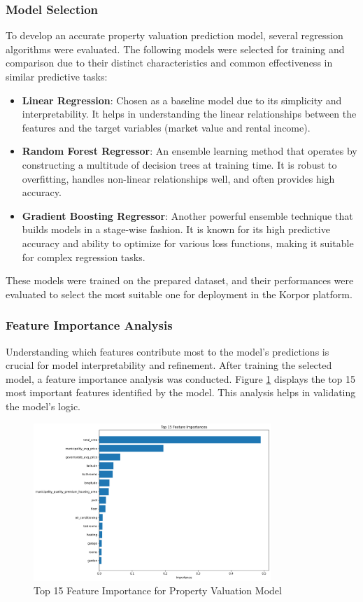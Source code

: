 \subsubsection{Model Selection}
To develop an accurate property valuation prediction model, several regression algorithms were evaluated. The following models were selected for training and comparison due to their distinct characteristics and common effectiveness in similar predictive tasks:
\begin{itemize}
    \item \textbf{Linear Regression}: Chosen as a baseline model due to its simplicity and interpretability. It helps in understanding the linear relationships between the features and the target variables (market value and rental income).
    \item \textbf{Random Forest Regressor}: An ensemble learning method that operates by constructing a multitude of decision trees at training time. It is robust to overfitting, handles non-linear relationships well, and often provides high accuracy.
    \item \textbf{Gradient Boosting Regressor}: Another powerful ensemble technique that builds models in a stage-wise fashion. It is known for its high predictive accuracy and ability to optimize for various loss functions, making it suitable for complex regression tasks.
\end{itemize}
These models were trained on the prepared dataset, and their performances were evaluated to select the most suitable one for deployment in the Korpor platform.

\subsubsection{Feature Importance Analysis}
Understanding which features contribute most to the model's predictions is crucial for model interpretability and refinement. After training the selected model, a feature importance analysis was conducted. Figure \ref{fig:feature-importance} displays the top 15 most important features identified by the model. This analysis helps in validating the model's logic.
\newpage

\begin{figure}[htbp]
    \centering
    \includegraphics[width=0.8\textwidth]{images/top_15_feature_importance.png} %
    \caption{Top 15 Feature Importance for Property Valuation Model}
    \label{fig:feature-importance}
\end{figure}

